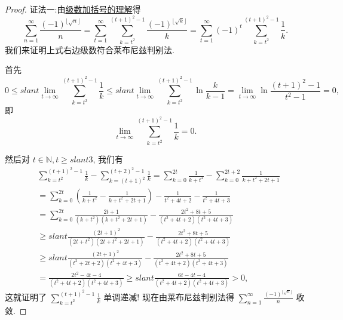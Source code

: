 \documentclass[../../main.tex]{subfiles}
\begin{document}
\begin{proof}
{\color{blue}证法一:}由\hyperref[theorem:级数加括号的理解]{级数加括号的理解}得
\[
\sum_{n=1}^{\infty}{\frac{(-1)^{\lfloor \sqrt{n} \rfloor}}{n}}=\sum_{t=1}^{\infty}{\sum_{k=t^2}^{(t+1)^2-1}{\frac{\left( -1 \right) ^{\lfloor \sqrt{k} \rfloor}}{k}}}=\sum_{t=1}^{\infty}{\left( -1 \right) ^t\sum_{k=t^2}^{(t+1)^2-1}{\frac{1}{k}}}.
\]
我们来证明上式右边级数符合莱布尼兹判别法.

首先
\[
0 \leqslant slant \lim_{t \to \infty} \sum_{k=t^2}^{(t + 1)^2 - 1} \frac{1}{k} \leqslant slant \lim_{t \to \infty} \sum_{k=t^2}^{(t + 1)^2 - 1} \ln \frac{k}{k - 1} = \lim_{t \to \infty} \ln \frac{(t + 1)^2 - 1}{t^2 - 1} = 0,
\]
即
\[
\lim_{t \to \infty} \sum_{k=t^2}^{(t + 1)^2 - 1} \frac{1}{k} = 0.
\]

然后对 $t \in \mathbb{N}, t \geqslant slant 3$, 我们有
\begin{align*}
&\sum_{k=t^2}^{(t + 1)^2 - 1} \frac{1}{k} - \sum_{k=(t + 1)^2}^{(t + 2)^2 - 1} \frac{1}{k} = \sum_{k=0}^{2t} \frac{1}{k + t^2} - \sum_{k=0}^{2t + 2} \frac{1}{k + t^2 + 2t + 1} \\
&= \sum_{k=0}^{2t} \left( \frac{1}{k + t^2} - \frac{1}{k + t^2 + 2t + 1} \right) - \frac{1}{t^2 + 4t + 2} - \frac{1}{t^2 + 4t + 3} \\
&= \sum_{k=0}^{2t} \frac{2t + 1}{(k + t^2)(k + t^2 + 2t + 1)} - \frac{2t^2 + 8t + 5}{(t^2 + 4t + 2)(t^2 + 4t + 3)} \\
& \geqslant slant \frac{(2t + 1)^2}{(2t + t^2)(2t + t^2 + 2t + 1)} - \frac{2t^2 + 8t + 5}{(t^2 + 4t + 2)(t^2 + 4t + 3)} \\
& \geqslant slant \frac{(2t + 1)^2}{(t^2 + 2t + 2)(t^2 + 4t + 3)} - \frac{2t^2 + 8t + 5}{(t^2 + 4t + 2)(t^2 + 4t + 3)} \\
&= \frac{2t^2 - 4t - 4}{(t^2 + 4t + 2)(t^2 + 4t + 3)} \geqslant slant \frac{6t - 4t - 4}{(t^2 + 4t + 2)(t^2 + 4t + 3)} > 0,
\end{align*}
这就证明了 $\sum_{k=t^2}^{(t + 1)^2 - 1} \frac{1}{k}$ 单调递减!
现在由莱布尼兹判别法得 $\sum_{n=1}^{\infty} \frac{(-1)^{\lfloor \sqrt{n} \rfloor}}{n}$ 收敛.


\end{proof}
\end{document}
